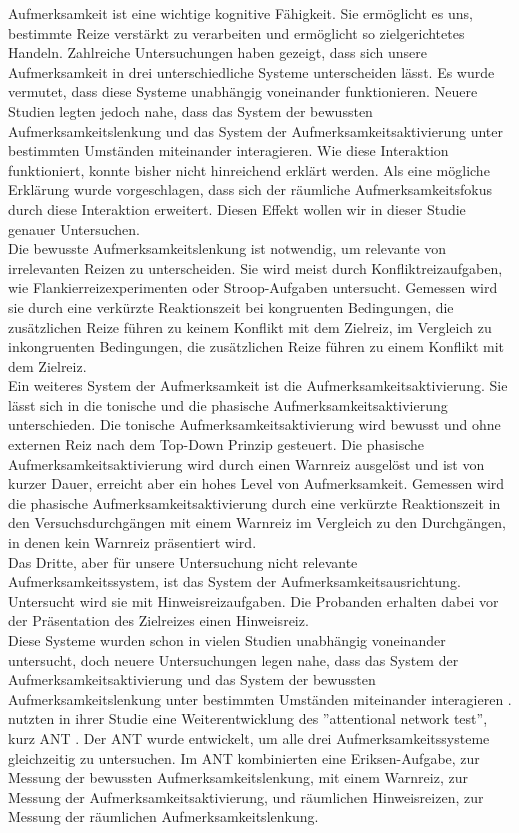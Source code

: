 Aufmerksamkeit ist eine wichtige kognitive Fähigkeit. Sie ermöglicht es uns, bestimmte Reize verstärkt zu verarbeiten und ermöglicht so zielgerichtetes Handeln. Zahlreiche Untersuchungen haben gezeigt, dass sich unsere Aufmerksamkeit in drei unterschiedliche Systeme unterscheiden lässt. Es wurde vermutet, dass diese Systeme unabhängig voneinander funktionieren. Neuere Studien legten jedoch nahe, dass das System der bewussten Aufmerksamkeitslenkung und das System der Aufmerksamkeitsaktivierung unter bestimmten Umständen miteinander interagieren. Wie diese Interaktion funktioniert, konnte bisher nicht hinreichend erklärt werden. Als eine mögliche Erklärung wurde vorgeschlagen, dass sich der räumliche Aufmerksamkeitsfokus durch diese Interaktion erweitert. Diesen Effekt wollen wir in dieser Studie genauer Untersuchen.\\
Die bewusste Aufmerksamkeitslenkung ist notwendig, um relevante von irrelevanten Reizen zu unterscheiden. Sie wird meist durch Konfliktreizaufgaben, wie Flankierreizexperimenten \cite{eriksen1974effects} oder Stroop-Aufgaben \cite{stroop1935studies} untersucht. Gemessen wird sie durch eine verkürzte Reaktionszeit bei kongruenten Bedingungen, die zusätzlichen Reize führen zu keinem Konflikt mit dem Zielreiz, im Vergleich zu inkongruenten Bedingungen, die zusätzlichen Reize führen zu einem Konflikt mit dem Zielreiz.\\
Ein weiteres System der Aufmerksamkeit ist die Aufmerksamkeitsaktivierung. Sie lässt sich in die tonische und die phasische Aufmerksamkeitsaktivierung unterschieden. Die tonische Aufmerksamkeitsaktivierung wird bewusst und ohne externen Reiz nach dem Top-Down Prinzip gesteuert. Die phasische Aufmerksamkeitsaktivierung wird durch einen Warnreiz ausgelöst und ist von kurzer Dauer, erreicht aber ein hohes Level von Aufmerksamkeit. Gemessen wird die phasische Aufmerksamkeitsaktivierung durch eine verkürzte Reaktionszeit in den Versuchsdurchgängen mit einem Warnreiz im Vergleich zu den Durchgängen, in denen kein Warnreiz präsentiert wird.\\
Das Dritte, aber für unsere Untersuchung nicht relevante Aufmerksamkeitssystem, ist das System der Aufmerksamkeitsausrichtung. Untersucht wird sie mit Hinweisreizaufgaben. Die Probanden erhalten dabei vor der Präsentation des Zielreizes einen Hinweisreiz.\\ 
Diese Systeme wurden schon in vielen Studien unabhängig voneinander untersucht, doch neuere Untersuchungen legen nahe, dass das System der Aufmerksamkeitsaktivierung und das System der bewussten Aufmerksamkeitslenkung unter bestimmten Umständen miteinander interagieren \cite{callejas2004three,weinbach2012relationship}.  nutzten in ihrer Studie eine Weiterentwicklung des ''attentional network test'', kurz ANT \cite{fan2002testing}. Der ANT wurde entwickelt, um alle drei Aufmerksamkeitssysteme gleichzeitig zu untersuchen. Im ANT kombinierten  eine Eriksen-Aufgabe, zur Messung der bewussten Aufmerksamkeitslenkung, mit einem Warnreiz, zur Messung der Aufmerksamkeitsaktivierung, und räumlichen Hinweisreizen, zur Messung der räumlichen Aufmerksamkeitslenkung.\\
